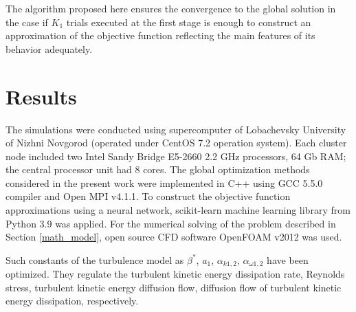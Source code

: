 \documentclass[sensors,article,submit,moreauthors,pdftex]{Definitions/mdpi}
\begin{document}
The algorithm proposed here ensures the convergence to the global solution in the case if $K_1$ trials executed at the first stage is enough to construct an approximation of the objective function reflecting the main features of its behavior adequately.




\section{Results}





The simulations were conducted using supercomputer of Lobachevsky University of Nizhni Novgorod (operated under CentOS 7.2 operation system). Each cluster node included two  Intel Sandy Bridge E5-2660 2.2 GHz processors, 64 Gb RAM; the central processor unit had 8 cores. 
The global optimization methods considered in the present work were implemented in C++ using GCC 5.5.0 compiler and Open MPI v4.1.1. To construct the objective function approximations using a neural network, scikit-learn machine learning library from Python 3.9 was applied. 
For the numerical solving of the problem described in Section \ref{math_model}, open source CFD software OpenFOAM v2012 was used.


Such constants of the turbulence model as $\beta^*$, $a_1$, $\alpha_{k 1,2}$, $\alpha_{\omega 1,2}$ have been optimized. They regulate the turbulent kinetic energy dissipation rate, Reynolds stress, turbulent kinetic energy diffusion flow, diffusion flow of turbulent kinetic energy dissipation, respectively.
\end{document}
